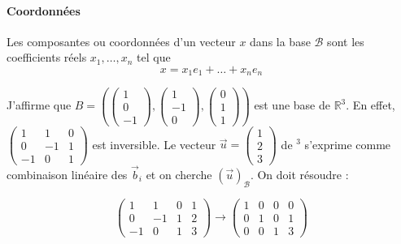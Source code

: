 \paragraph{Coordonnées}
\begin{definition}
    Les composantes ou coordonnées d'un vecteur $x$ dans la base $\mathcal{B}$ sont les coefficients réels $x_1, \dots, x_n$ tel que
    \[x = x_1e_1 + \dots + x_ne_n\]
\end{definition}
J'affirme que $
B = \left(
\begin{pmatrix}
1 \\
0 \\
-1
\end{pmatrix},
\begin{pmatrix}
1 \\
-1 \\
0
\end{pmatrix},
\begin{pmatrix}
0 \\
1 \\
1
\end{pmatrix}
\right)
$ est une base de \(\mathbb{R}^3\). En effet, $\begin{pmatrix}
    1 & 1 & 0 \\
    0 & -1 & 1 \\
    -1 & 0 & 1
\end{pmatrix}$ est inversible. Le vecteur $\vec{u} = \begin{pmatrix}
    1 \\ 2 \\ 3
\end{pmatrix}$ de \R$^3$ s'exprime comme combinaison linéaire des $\vec{b}_i$ et on cherche $(\vec{u})_\mathcal{B}$. On doit résoudre :

\[\left ( \begin{array}{ccc|c}
    1 & 1 & 0 & 1 \\
    0 & -1 & 1 & 2 \\
    -1 & 0 & 1 & 3
\end{array} \right) \to \left (\begin{array}{ccc|c}
    1 & 0 & 0 & 0 \\
    0 & 1 & 0 & 1 \\
    0 & 0 & 1 & 3 
\end{array}\right )\]

